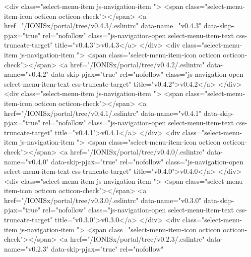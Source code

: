             <div class="select-menu-item js-navigation-item ">
              <span class="select-menu-item-icon octicon octicon-check"></span>
              <a href="/IONISx/portal/tree/v0.4.3/.eslintrc"
                 data-name="v0.4.3"
                 data-skip-pjax="true"
                 rel="nofollow"
                 class="js-navigation-open select-menu-item-text css-truncate-target"
                 title="v0.4.3">v0.4.3</a>
            </div>
            <div class="select-menu-item js-navigation-item ">
              <span class="select-menu-item-icon octicon octicon-check"></span>
              <a href="/IONISx/portal/tree/v0.4.2/.eslintrc"
                 data-name="v0.4.2"
                 data-skip-pjax="true"
                 rel="nofollow"
                 class="js-navigation-open select-menu-item-text css-truncate-target"
                 title="v0.4.2">v0.4.2</a>
            </div>
            <div class="select-menu-item js-navigation-item ">
              <span class="select-menu-item-icon octicon octicon-check"></span>
              <a href="/IONISx/portal/tree/v0.4.1/.eslintrc"
                 data-name="v0.4.1"
                 data-skip-pjax="true"
                 rel="nofollow"
                 class="js-navigation-open select-menu-item-text css-truncate-target"
                 title="v0.4.1">v0.4.1</a>
            </div>
            <div class="select-menu-item js-navigation-item ">
              <span class="select-menu-item-icon octicon octicon-check"></span>
              <a href="/IONISx/portal/tree/v0.4.0/.eslintrc"
                 data-name="v0.4.0"
                 data-skip-pjax="true"
                 rel="nofollow"
                 class="js-navigation-open select-menu-item-text css-truncate-target"
                 title="v0.4.0">v0.4.0</a>
            </div>
            <div class="select-menu-item js-navigation-item ">
              <span class="select-menu-item-icon octicon octicon-check"></span>
              <a href="/IONISx/portal/tree/v0.3.0/.eslintrc"
                 data-name="v0.3.0"
                 data-skip-pjax="true"
                 rel="nofollow"
                 class="js-navigation-open select-menu-item-text css-truncate-target"
                 title="v0.3.0">v0.3.0</a>
            </div>
            <div class="select-menu-item js-navigation-item ">
              <span class="select-menu-item-icon octicon octicon-check"></span>
              <a href="/IONISx/portal/tree/v0.2.3/.eslintrc"
                 data-name="v0.2.3"
                 data-skip-pjax="true"
                 rel="nofollow"
